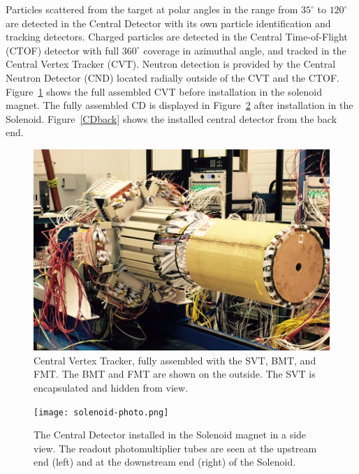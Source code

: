 \documentclass[final,3p,twocolumn]{elsarticle}
\begin{document}
Particles scattered from the target at polar angles in the range from $35^\circ$  to $120^\circ$ are detected in the
Central Detector with its own particle identification and tracking detectors. Charged particles are detected in the
Central Time-of-Flight (CTOF) detector with full $360^\circ$ coverage in azimuthal angle, and tracked in the Central
Vertex Tracker (CVT). Neutron detection is provided by the Central Neutron Detector (CND) located radially outside
of the CVT and the CTOF.  Figure~\ref{CVT} shows the full assembled CVT before installation in the solenoid magnet.
The fully assembled CD is displayed in  Figure~\ref{CDinSol} after installation in the Solenoid.  Figure~\ref{CDback}
shows the installed central detector from the back end.    

\begin{figure}[htbp!]
\centerline{\includegraphics[width=1.0\columnwidth]{CVT.png}}
\caption{Central Vertex Tracker, fully assembled with the SVT, BMT, and FMT. The BMT and FMT are shown on the
outside. The SVT is encapsulated and hidden from view.}
\label{CVT}
\end{figure}

\begin{figure}[htbp!]
\centerline{\texttt{[image: solenoid-photo.png]}}
\caption{The Central Detector installed in the Solenoid magnet in a side view. The readout photomultiplier tubes are seen
at the upstream end (left) and at the downstream end (right) of the Solenoid.}
\label{CDinSol}
\end{figure}
\end{document}
